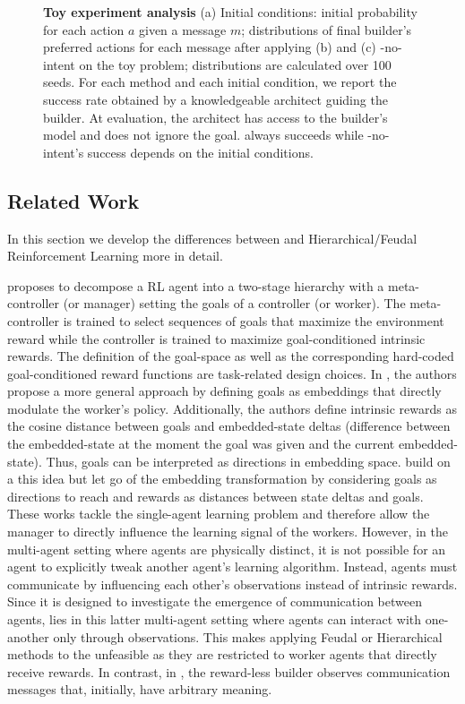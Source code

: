 \begin{figure}[h!]
{\begin{tabular}{ccc}
    \end{tabular}
    }
    \caption{\textbf{Toy experiment analysis} (a) Initial conditions: initial probability for each action $a$ given a message $m$; distributions of final builder's preferred actions for each message after applying (b) \abig and (c) \abig-no-intent on the toy problem; distributions are calculated over 100 seeds. For each method and each initial condition, we report the success rate obtained by a knowledgeable architect guiding the builder. At evaluation, the architect has access to the builder's model and does not ignore the goal. \abig always succeeds while \abig-no-intent's success depends on the initial conditions.}
    \label{sup:fig_res_toy}
\end{figure}

\newpage

\subsection{Related Work}
\label{ap:sec_related_work}
In this section we develop the differences between \abp and Hierarchical/Feudal Reinforcement Learning more in detail.

\cite{kulkarni2016hierarchical} proposes to decompose a RL agent into a two-stage hierarchy with a meta-controller (or manager) setting the goals of a controller (or worker). The meta-controller is trained to select sequences of goals that maximize the environment reward while the controller is trained to maximize goal-conditioned intrinsic rewards. The definition of the goal-space as well as the corresponding hard-coded goal-conditioned reward functions are task-related design choices. In \cite{vezhnevets2017feudal}, the authors propose a more general approach by defining goals as embeddings that directly modulate the worker's policy. Additionally, the authors define intrinsic rewards as the cosine distance between goals and embedded-state deltas (difference between the embedded-state at the moment the goal was given and the current embedded-state). Thus, goals can be interpreted as directions in embedding space.
\cite{nachum2018data} build on a this idea but let go of the embedding transformation by considering goals as directions to reach and rewards as distances between state deltas and goals. 
These works tackle the single-agent learning problem and therefore allow the manager to directly influence the learning signal of the workers. However, in the multi-agent setting where agents are physically distinct, it is not possible for an agent to explicitly tweak another agent's learning algorithm. Instead, agents must communicate by influencing each other's observations instead of intrinsic rewards. Since it is designed to investigate the emergence of communication between agents, \abp lies in this latter multi-agent setting where agents can interact with one-another only through observations. This makes applying Feudal or Hierarchical methods to the \abp unfeasible as they are restricted to worker agents that directly receive rewards. In contrast, in \abp, the reward-less builder observes communication messages that, initially, have arbitrary meaning.  



